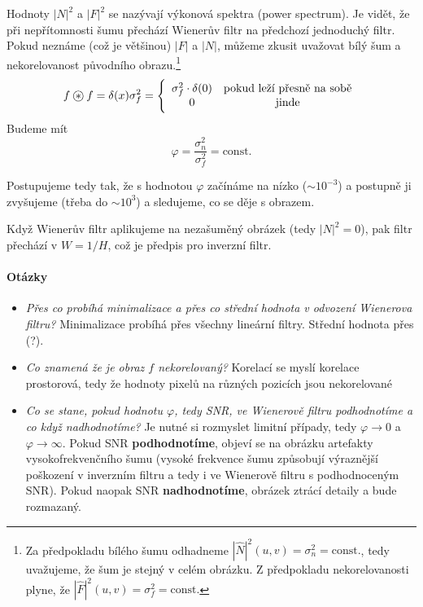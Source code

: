 Hodnoty $|N|^2$ a $|F|^2$ se nazývají výkonová spektra (power spectrum). Je vidět, že při nepřítomnosti šumu 
přechází Wienerův filtr na předchozí jednoduchý filtr. Pokud neznáme (což je většinou) $|F|$ a $|N|$, můžeme zkusit
uvažovat bílý šum a nekorelovanost původního obrazu.\footnote{ Za předpokladu bílého šumu odhadneme $ |\hat{N}|^2 (u,v) = \sigma^2_n = \text{const.} $, tedy uvažujeme, že šum je stejný v celém obrázku. Z předpokladu nekorelovanosti plyne, že $ |\hat{F}|^2 (u,v) = \sigma^2_f = \text{const.} $ }
\begin{equation}
 f\corr f = \delta(x)\sigma_f^2=\left\{\begin{array}{cc}\sigma_f^2\cdot\delta(0)&\hbox{pokud leží přesně na sobě}\\0&\hbox{jinde}\end{array}\right.
\end{equation}
Budeme mít
\begin{equation}
\varphi = \frac{\sigma_n^2}{\sigma_f^2} = \text{const.}
\end{equation}

Postupujeme tedy tak, že s hodnotou $\varphi$ začínáme na nízko ($\sim 10^{-3}$) a postupně ji zvyšujeme (třeba do $ \sim 10^3 $) a sledujeme, co se děje s obrazem. 

Když Wienerův filtr aplikujeme na nezašuměný obrázek (tedy $ |N|^2 = 0 $), pak filtr přechází v $ W = 1/H $, což je předpis pro inverzní filtr.

\paragraph{Otázky}
\begin{itemize}
	\item \emph{Přes co probíhá minimalizace a přes co střední hodnota v odvození Wienerova filtru?} Minimalizace probíhá přes všechny lineární filtry. Střední hodnota přes (?).
	\item \emph{Co znamená že je obraz $ f $ nekorelovaný?} Korelací se myslí korelace prostorová, tedy že hodnoty pixelů na různých pozicích jsou nekorelované
	\item \emph{Co se stane, pokud hodnotu $ \varphi $, tedy SNR, ve Wienerově filtru podhodnotíme a co když nadhodnotíme?} Je nutné si rozmyslet limitní případy, tedy $ \varphi \to 0 $ a $ \varphi \to \infty $. Pokud SNR \textbf{podhodnotíme}, objeví se na obrázku artefakty vysokofrekvenčního šumu (vysoké frekvence šumu způsobují výraznější poškození v inverzním filtru a tedy i ve Wienerově filtru s podhodnoceným SNR). Pokud naopak SNR \textbf{nadhodnotíme}, obrázek ztrácí detaily a bude rozmazaný.
\end{itemize}

